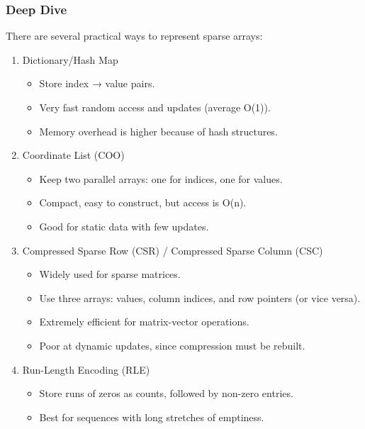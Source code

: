 \documentclass[
  letterpaper,
  DIV=11,
  numbers=noendperiod]{scrreprt}
\providecommand{\tightlist}{%
  \setlength{\itemsep}{0pt}\setlength{\parskip}{0pt}}
\begin{document}
\subsubsection{Deep Dive}\label{deep-dive-16}

There are several practical ways to represent sparse arrays:

\begin{enumerate}
\def\labelenumi{\arabic{enumi}.}
\item
  Dictionary/Hash Map

  \begin{itemize}
  \tightlist
  \item
    Store index → value pairs.
  \item
    Very fast random access and updates (average O(1)).
  \item
    Memory overhead is higher because of hash structures.
  \end{itemize}
\item
  Coordinate List (COO)

  \begin{itemize}
  \tightlist
  \item
    Keep two parallel arrays: one for indices, one for values.
  \item
    Compact, easy to construct, but access is O(n).
  \item
    Good for static data with few updates.
  \end{itemize}
\item
  Compressed Sparse Row (CSR) / Compressed Sparse Column (CSC)

  \begin{itemize}
  \tightlist
  \item
    Widely used for sparse matrices.
  \item
    Use three arrays: values, column indices, and row pointers (or vice
    versa).
  \item
    Extremely efficient for matrix-vector operations.
  \item
    Poor at dynamic updates, since compression must be rebuilt.
  \end{itemize}
\item
  Run-Length Encoding (RLE)

  \begin{itemize}
  \tightlist
  \item
    Store runs of zeros as counts, followed by non-zero entries.
  \item
    Best for sequences with long stretches of emptiness.
  \end{itemize}
\end{enumerate}
\end{document}
